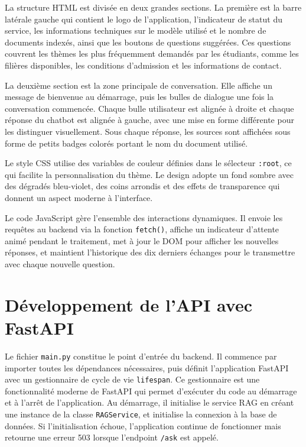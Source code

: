 \documentclass[12pt, a4paper, twoside]{report}
\begin{document}
La structure HTML est divisée en deux grandes sections. La première est la barre latérale gauche qui contient le logo de l'application, l'indicateur de statut du service, les informations techniques sur le modèle utilisé et le nombre de documents indexés, ainsi que les boutons de questions suggérées. Ces questions couvrent les thèmes les plus fréquemment demandés par les étudiants, comme les filières disponibles, les conditions d'admission et les informations de contact.

La deuxième section est la zone principale de conversation. Elle affiche un message de bienvenue au démarrage, puis les bulles de dialogue une fois la conversation commencée. Chaque bulle utilisateur est alignée à droite et chaque réponse du chatbot est alignée à gauche, avec une mise en forme différente pour les distinguer visuellement. Sous chaque réponse, les sources sont affichées sous forme de petits badges colorés portant le nom du document utilisé.

Le style CSS utilise des variables de couleur définies dans le sélecteur \texttt{:root}, ce qui facilite la personnalisation du thème. Le design adopte un fond sombre avec des dégradés bleu-violet, des coins arrondis et des effets de transparence qui donnent un aspect moderne à l'interface.

Le code JavaScript gère l'ensemble des interactions dynamiques. Il envoie les requêtes au backend via la fonction \texttt{fetch()}, affiche un indicateur d'attente animé pendant le traitement, met à jour le DOM pour afficher les nouvelles réponses, et maintient l'historique des dix derniers échanges pour le transmettre avec chaque nouvelle question.

\section{Développement de l'API avec FastAPI}
Le fichier \texttt{main.py} constitue le point d'entrée du backend. Il commence par importer toutes les dépendances nécessaires, puis définit l'application FastAPI avec un gestionnaire de cycle de vie \texttt{lifespan}. Ce gestionnaire est une fonctionnalité moderne de FastAPI qui permet d'exécuter du code au démarrage et à l'arrêt de l'application. Au démarrage, il initialise le service RAG en créant une instance de la classe \texttt{RAGService}, et initialise la connexion à la base de données. Si l'initialisation échoue, l'application continue de fonctionner mais retourne une erreur 503 lorsque l'endpoint \texttt{/ask} est appelé.
\newpage
\end{document}
